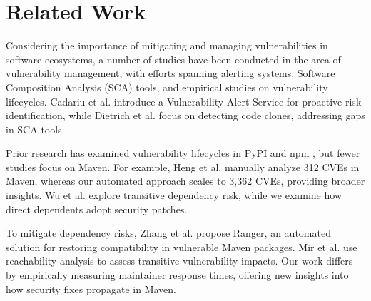\section{Related Work}
Considering the importance of mitigating and managing vulnerabilities in software ecosystems, a number of studies have been conducted in the area of vulnerability management, with efforts spanning alerting systems, Software Composition Analysis (SCA) tools, and empirical studies on vulnerability lifecycles. Cadariu et al. \cite{cadariu2015tracking} introduce a Vulnerability Alert Service for proactive risk identification, while Dietrich et al. \cite{dietrich2023security} focus on detecting code clones, addressing gaps in SCA tools.

Prior research has examined vulnerability lifecycles in PyPI \cite{alfadel2023empirical, 9647791} and npm \cite{10.1007/s10664-022-10154-1, 236368, Alfadel2022OnTD}, but fewer studies focus on Maven. For example, Heng et al. \cite{heng2024discovery} manually analyze 312 CVEs in Maven, whereas our automated approach scales to 3,362 CVEs, providing broader insights. Wu et al. \cite{10172868} explore transitive dependency risk, while we examine how direct dependents adopt security patches.

To mitigate dependency risks, Zhang et al. \cite{zhang2023mitigating} propose Ranger, an automated solution for restoring compatibility in vulnerable Maven packages. Mir et al. \cite{mir2023effecttransitivitygranularityvulnerability} use reachability analysis to assess transitive vulnerability impacts. Our work differs by empirically measuring maintainer response times, offering new insights into how security fixes propagate in Maven.